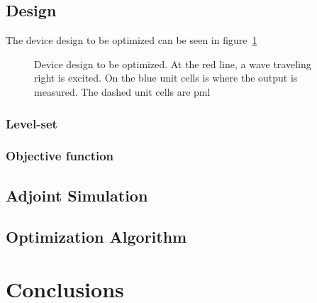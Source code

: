 \documentclass[11pt]{article}
\begin{document}
\subsection{Design}

The device design to be optimized can be seen in figure~\ref{fig:bs-design}

\begin{figure}[htpb]
	\centering
	
	\caption{
		Device design to be optimized.
		At the red line, a wave traveling right is excited.
		On the blue unit cells is where the output is measured.
		The dashed unit cells are \gls{pml}
	}
	\label{fig:bs-design}
\end{figure}

\subsubsection{Level-set}




\subsubsection{Objective function}



\subsection{Adjoint Simulation}

\subsection{Optimization Algorithm}

\section{Conclusions}

\printbibliography{}
\end{document}
